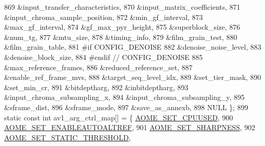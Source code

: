 \begin{DoxyCodeInclude}
{{{{{{{869                                        &input\_transfer\_characteristics,
870                                        &input\_matrix\_coefficients,
871                                        &input\_chroma\_sample\_position,
872                                        &min\_gf\_interval,
873                                        &max\_gf\_interval,
874                                        &gf\_max\_pyr\_height,
875                                        &superblock\_size,
876                                        &num\_tg,
877                                        &mtu\_size,
878                                        &timing\_info,
879                                        &film\_grain\_test,
880                                        &film\_grain\_table,
881 \textcolor{preprocessor}{#if CONFIG\_DENOISE}
882                                        &denoise\_noise\_level,
883                                        &denoise\_block\_size,
884 \textcolor{preprocessor}{#endif  // CONFIG\_DENOISE}
885                                        &max\_reference\_frames,
886                                        &reduced\_reference\_set,
887                                        &enable\_ref\_frame\_mvs,
888                                        &target\_seq\_level\_idx,
889                                        &set\_tier\_mask,
890                                        &set\_min\_cr,
891                                        &bitdeptharg,
892                                        &inbitdeptharg,
893                                        &input\_chroma\_subsampling\_x,
894                                        &input\_chroma\_subsampling\_y,
895                                        &sframe\_dist,
896                                        &sframe\_mode,
897                                        &save\_as\_annexb,
898                                        NULL \};
899 \textcolor{keyword}{static} \textcolor{keyword}{const} \textcolor{keywordtype}{int} av1\_arg\_ctrl\_map[] = \{ \hyperlink{group__aom__encoder_ggae78dde67a6d78f332e9bdba0dde42db5adac09e1a8da079b08fca5ccbf981f1a6}{AOME\_SET\_CPUUSED},
900                                         \hyperlink{group__aom__encoder_ggae78dde67a6d78f332e9bdba0dde42db5ac8a24393f214823f5a6bd345afb840b6}{AOME\_SET\_ENABLEAUTOALTREF},
901                                         \hyperlink{group__aom__encoder_ggae78dde67a6d78f332e9bdba0dde42db5a0df0d30e82bb9683f3131138dfa2949a}{AOME\_SET\_SHARPNESS},
902                                         \hyperlink{group__aom__encoder_ggae78dde67a6d78f332e9bdba0dde42db5aa4f58f6a86b710e403daeac055738111}{AOME\_SET\_STATIC\_THRESHOLD},
}}}}}}}
\end{DoxyCodeInclude}
